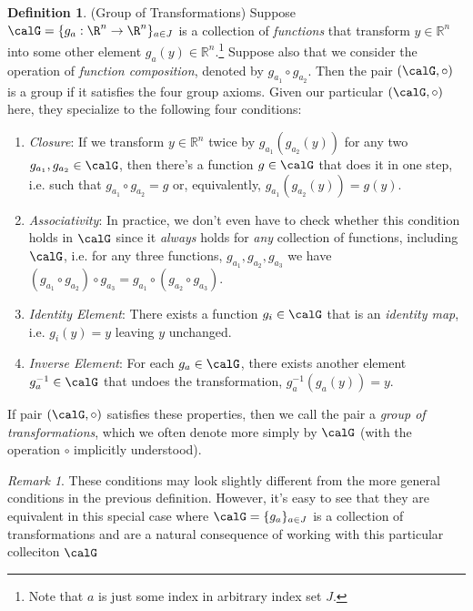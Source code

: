 \documentclass[12pt]{article}
\theoremstyle{plain}
\theoremstyle{definition}
\newtheorem{defn}[thm]{Definition}
\theoremstyle{remark}
\newtheorem*{rmk}{Remark}
\newcommand{\ra}{\rightarrow}
\newcommand{\Rn}{\mathbb{R}^n}
\begin{document}
\begin{defn}(Group of Transformations)
Suppose $\calG=\{g_a:\R^n\ra\R^n\}_{a\in J}$ is a collection
of \emph{functions} that transform $y\in\Rn$ into some other element
$g_a(y)\in\Rn$.\footnote{%
  Note that $a$ is just some index in arbitrary index set $J$.
}
Suppose also that we consider the operation
of \emph{function composition}, denoted by $g_{a_1}\circ
g_{a_2}$.
Then the pair $(\calG,\circ)$ is a group if it satisfies the four group
axioms. Given our particular $(\calG,\circ)$ here, they specialize to
the following four conditions:
\begin{enumerate}[label=(\roman*)]
  \item \emph{Closure}:
    If we transform $y\in\Rn$ twice by $g_{a_1}(g_{a_2}(y))$
    for any two $g_{a_1},g_{a_2}\in\calG$, then there's a
    function $g\in\calG$ that does it in one step, i.e. such that
    $g_{a_1}\circ g_{a_2}=g$ or, equivalently,
    $g_{a_1}(g_{a_2}(y))=g(y)$.

  \item \emph{Associativity}:
    In practice, we don't even have to check whether this condition
    holds in $\calG$ since it \emph{always} holds for \emph{any}
    collection of functions, including $\calG$, i.e.
    for any three functions,
    $g_{a_1},g_{a_2},g_{a_3}$
    we have $(g_{a_1}\circ g_{a_2})\circ g_{a_3} =
    g_{a_1} \circ (g_{a_2}\circ g_{a_3})$.

  \item \emph{Identity Element}:
    There exists a function $g_i\in\calG$ that is an
    \emph{identity map}, i.e. $g_i(y)=y$ leaving $y$ unchanged.

  \item \emph{Inverse Element}:
    For each $g_a\in\calG$, there exists another element
    $g_{a}^{-1}\in\calG$ that undoes the transformation,
    $g^{-1}_a(g_{a}(y))=y$.
\end{enumerate}
If pair $(\calG,\circ)$ satisfies these properties, then we call the
pair a \emph{group of transformations}, which we often denote more
simply by $\calG$ (with the operation $\circ$ implicitly understood).
\end{defn}
\begin{rmk}
These conditions may look slightly different from the more general
conditions in the previous definition.
However, it's easy to see that they are equivalent in this special case
where $\calG=\{g_a\}_{a\in J}$ is a collection of transformations
and are a natural consequence of working with this particular colleciton
$\calG$
\end{rmk}
\end{document}
